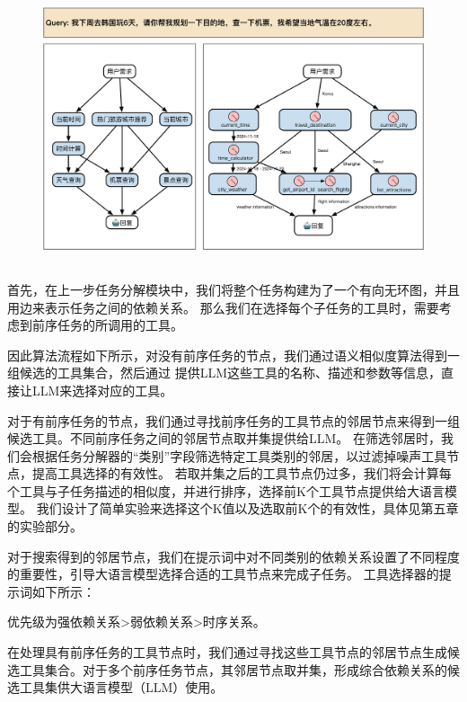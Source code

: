 \begin{figure}[!htp]
  \vspace{1em}
  \centering
  \setlength{\abovecaptionskip}{10pt} %
  \includegraphics[height=8cm]{../assets/ch4-工具选择器.pdf}
  \label{fig:ch4-dfs}
\end{figure}

首先，在上一步任务分解模块中，我们将整个任务构建为了一个有向无环图，并且用边来表示任务之间的依赖关系。
那么我们在选择每个子任务的工具时，需要考虑到前序任务的所调用的工具。

因此算法流程如下所示，对没有前序任务的节点，我们通过语义相似度算法得到一组候选的工具集合，然后通过
提供LLM这些工具的名称、描述和参数等信息，直接让LLM来选择对应的工具。

对于有前序任务的节点，我们通过寻找前序任务的工具节点的邻居节点来得到一组候选工具。不同前序任务之间的邻居节点取并集提供给LLM。
在筛选邻居时，我们会根据任务分解器的“类别”字段筛选特定工具类别的邻居，以过滤掉噪声工具节点，提高工具选择的有效性。
若取并集之后的工具节点仍过多，我们将会计算每个工具与子任务描述的相似度，并进行排序，选择前K个工具节点提供给大语言模型。
我们设计了简单实验来选择这个K值以及选取前K个的有效性，具体见第五章的实验部分。

对于搜索得到的邻居节点，我们在提示词中对不同类别的依赖关系设置了不同程度的重要性，引导大语言模型选择合适的工具节点来完成子任务。
工具选择器的提示词如下所示：

优先级为强依赖关系>弱依赖关系>时序关系。

在处理具有前序任务的工具节点时，我们通过寻找这些工具节点的邻居节点生成候选工具集合。对于多个前序任务节点，其邻居节点取并集，形成综合依赖关系的候选工具集供大语言模型（LLM）使用。

